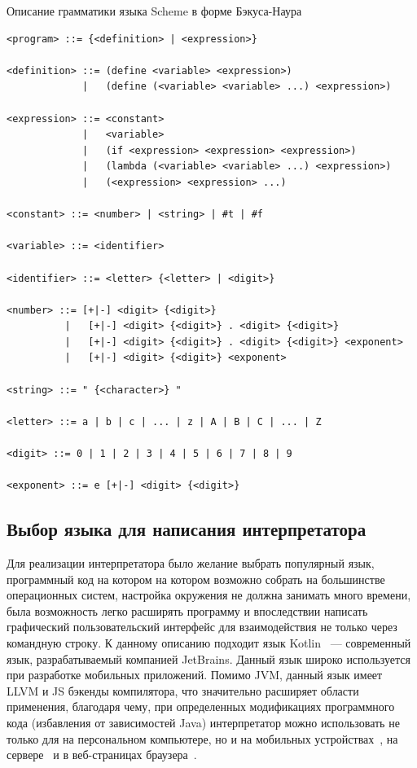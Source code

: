 \documentclass[14pt, russian]{scrartcl}
\begin{document}
\begin{listing}[!htb]
\caption{Описание грамматики языка Scheme в форме Бэкуса-Наура}
\label{lst:schemebnf}
\begin{verbatim}
<program> ::= {<definition> | <expression>}

<definition> ::= (define <variable> <expression>)
             |   (define (<variable> <variable> ...) <expression>)

<expression> ::= <constant>
             |   <variable>
             |   (if <expression> <expression> <expression>)
             |   (lambda (<variable> <variable> ...) <expression>)
             |   (<expression> <expression> ...)

<constant> ::= <number> | <string> | #t | #f

<variable> ::= <identifier>

<identifier> ::= <letter> {<letter> | <digit>}

<number> ::= [+|-] <digit> {<digit>}
          |   [+|-] <digit> {<digit>} . <digit> {<digit>}
          |   [+|-] <digit> {<digit>} . <digit> {<digit>} <exponent>
          |   [+|-] <digit> {<digit>} <exponent>

<string> ::= " {<character>} "

<letter> ::= a | b | c | ... | z | A | B | C | ... | Z

<digit> ::= 0 | 1 | 2 | 3 | 4 | 5 | 6 | 7 | 8 | 9

<exponent> ::= e [+|-] <digit> {<digit>}
\end{verbatim}
\end{listing}

\subsection{Выбор языка для написания интерпретатора}

Для реализации интерпретатора было желание выбрать популярный язык, программный код на котором на котором возможно собрать на большинстве операционных систем, настройка окружения не должна занимать много времени, была возможность легко расширять программу и впоследствии написать графический пользовательский интерфейс для взаимодействия не только через командную строку.
К данному описанию подходит язык Kotlin~\cite{Kotlindocs} --- современный язык, разрабатываемый компанией JetBrains.
Данный язык широко используется при разработке мобильных приложений.
Помимо JVM, данный язык имеет LLVM и JS бэкенды компилятора, что значительно расширяет области применения, благодаря чему, при определенных модификациях программного кода (избавления от зависимостей Java) интерпретатор можно использовать не только для на персональном компьютере, но и на мобильных устройствах~\cite{Kmm}, на сервере~\cite{Kserv} и в веб-страницах браузера~\cite{Kjs}.
\end{document}
